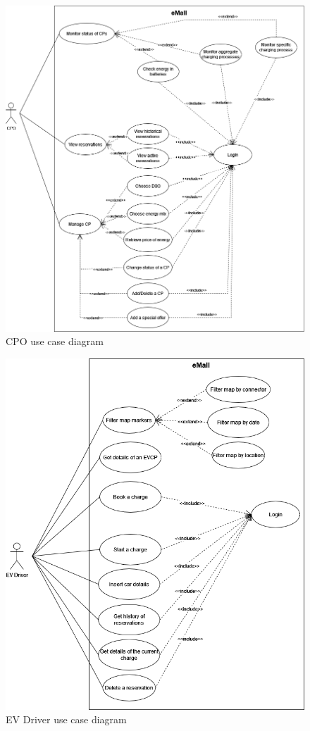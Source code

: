 \begin{figure}[hp]
    \centering
    \includegraphics[scale=0.5]{src/use_case_diagram/cpo.png}
    \caption{CPO use case diagram}
\end{figure}

\begin{figure}[hp]
    \centering
    \includegraphics[scale=0.6]{src/use_case_diagram/driver.png}
    \caption{EV Driver use case diagram}
\end{figure}

